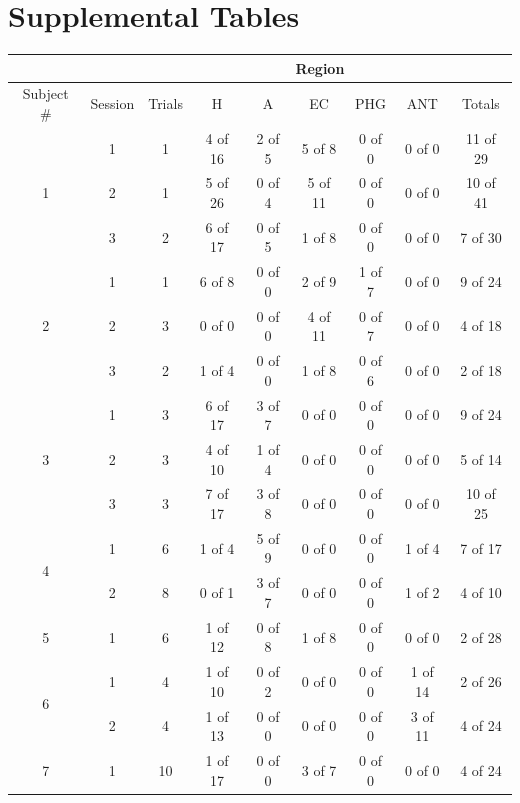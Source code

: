 \section{Supplemental Tables}
\begin{table}[ph]
\centering
 \begin{tabular}{|ccc|ccccc||c|}

\multicolumn{3}{c|}{} & \multicolumn{5}{|c||}{Region} & \multicolumn{1}{c}{}\\\hline
      Subject $\#$ & Session & Trials & H & A & EC & PHG & ANT & Totals\\\hline
      \multirow{3}{*}{1} & 1 & 1 & 4 of 16 & 2 of 5 & 5 of 8 & 0 of 0 & 0 of 0 & 11 of 29\\
      & 2 & 1 & 5 of 26 & 0 of 4 & 5 of 11 & 0 of 0 & 0 of 0 & 10 of 41\\
      & 3 & 2 & 6 of 17 & 0 of 5 & 1 of 8 & 0 of 0 & 0 of 0 & 7 of 30\\\hline
      \multirow{3}{*}{2} & 1 & 1 & 6 of 8 & 0 of 0 & 2 of 9 & 1 of 7 & 0 of 0 & 9 of 24\\
      & 2 & 3 & 0 of 0 & 0 of 0 & 4 of 11 & 0 of 7 & 0 of 0 & 4 of 18\\
      & 3 & 2 & 1 of 4 & 0 of 0 & 1 of 8 & 0 of 6 & 0 of 0 & 2 of 18\\\hline
      \multirow{3}{*}{3} & 1 & 3 & 6 of 17 & 3 of 7 & 0 of 0 & 0 of 0 & 0 of 0 & 9 of 24\\
      & 2 & 3 & 4 of 10 & 1 of 4 & 0 of 0 & 0 of 0 & 0 of 0 & 5 of 14\\
      & 3 & 3 & 7 of 17 & 3 of 8 & 0 of 0 & 0 of 0 & 0 of 0 & 10 of 25\\\hline
      \multirow{2}{*}{4} & 1 & 6 & 1 of 4 & 5 of 9 & 0 of 0 & 0 of 0 & 1 of 4 & 7 of 17\\
      & 2 & 8 & 0 of 1 & 3 of 7 & 0 of 0 & 0 of 0 & 1 of 2 & 4 of 10\\\hline
      5 & 1 & 6 & 1 of 12 & 0 of 8 & 1 of 8 & 0 of 0 & 0 of 0 & 2 of 28\\\hline
      \multirow{2}{*}{6} & 1 & 4 & 1 of 10 & 0 of 2 & 0 of 0 & 0 of 0 & 1 of 14 & 2 of 26\\
      & 2 & 4 & 1 of 13 & 0 of 0 & 0 of 0 & 0 of 0 & 3 of 11 & 4 of 24\\\hline
      \multirow{2}{*}{7}  & 1 & 10 & 1 of 17 & 0 of 0 & 3 of 7 & 0 of 0 & 0 of 0 & 4 of 24\\

\end{tabular}
\end{table}
